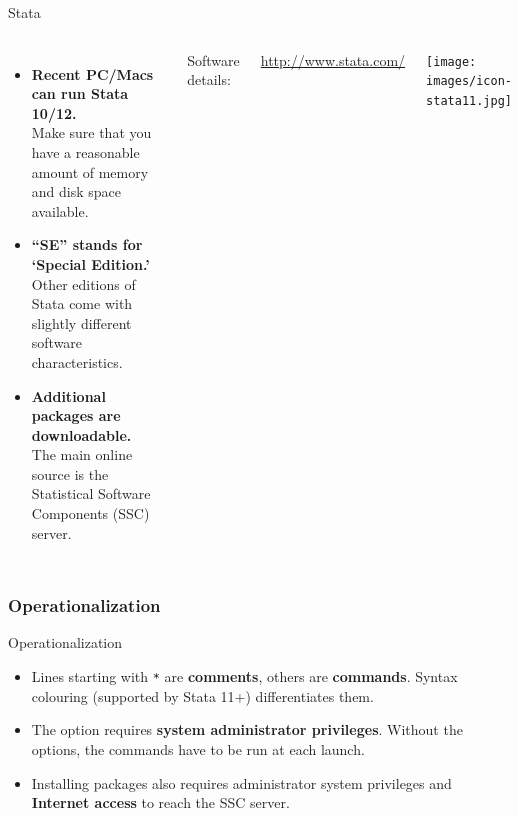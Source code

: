 \documentclass{beamer}
\begin{document}
	\begin{frame}[t]{Stata }
		\begin{columns}[T]
			\begin{itemize}
				\item \textbf{Recent PC/Macs can run Stata 10/12.}\\ Make sure that you have a reasonable amount of memory and disk space available.
				
				\item \textbf{``SE'' stands for `Special Edition.'}\\ Other editions of Stata come with slightly different software characteristics.
				
				\item \textbf{Additional packages are downloadable.}\\ The main online source is the  Statistical Software Components (SSC) server.

			\end{itemize}
			
			Software details:
			
			\url{http://www.stata.com/}

			\texttt{[image: images/icon-stata11.jpg]}
		\end{columns}
	\end{frame}

	\subsubsection{Operationalization}

	\begin{frame}[t]{Operationalization}
									
					




						
		\begin{itemize}
			\item Lines starting with \texttt{*} are \textbf{comments}, others are \textbf{commands}. Syntax colouring (supported by Stata 11+) differentiates them.
			\item The  option requires \textbf{system administrator privileges}. Without the options, the commands have to be run at each launch.
			\item Installing packages also requires administrator system privileges and \textbf{Internet access} to reach the SSC server.			
		\end{itemize}
	\end{frame}
\end{document}
